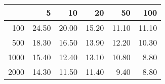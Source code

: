\begin{tabular}{rrrrrr}
  \hline
 & 5 & 10 & 20 & 50 & 100 \\ 
  \hline
100 & 24.50 & 20.00 & 15.20 & 11.10 & 11.10 \\ 
  500 & 18.30 & 16.50 & 13.90 & 12.20 & 10.30 \\ 
  1000 & 15.40 & 12.40 & 13.10 & 10.80 & 8.80 \\ 
  2000 & 14.30 & 11.50 & 11.40 & 9.40 & 8.80 \\ 
   \hline
\end{tabular}
